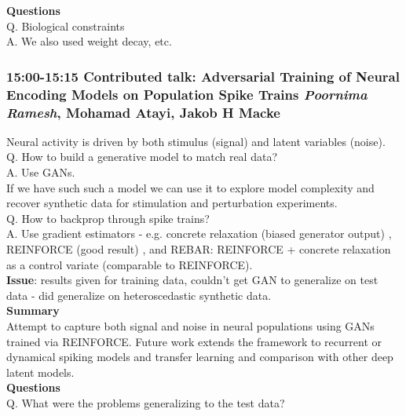 \documentclass[12pt]{article}
\begin{document}
\textbf{Questions} \\

Q. Biological constraints \\

A. We also used weight decay, etc.


\subsubsection{15:00-15:15 Contributed talk: Adversarial Training of Neural Encoding Models on Population Spike Trains \textit{Poornima Ramesh}, Mohamad Atayi, Jakob H Macke}

Neural activity is driven by both stimulus (signal) and latent variables (noise). \\

Q. How to build a generative model to match real data? \\

A. Use GANs. \\

If we have such such a model we can use it to explore model complexity and recover synthetic data for stimulation and perturbation experiments. \\

Q. How to backprop through spike trains? \\

A. Use gradient estimators - e.g. concrete relaxation (biased generator output) \cite{Maddison16}, REINFORCE (good result) \cite{Williams1992}, and REBAR: REINFORCE + concrete relaxation as a control variate (comparable to REINFORCE). \\

\textbf{Issue}: results given for training data, couldn't get GAN to generalize on test data - did generalize on heteroscedastic synthetic data. \\

\textbf{Summary} \\

Attempt to capture both signal and noise in neural populations using GANs trained via REINFORCE. Future work extends the framework to recurrent or dynamical spiking models and transfer learning and comparison with other deep latent models. \\

\textbf{Questions} \\

Q. What were the problems generalizing to the test data? \\
\end{document}
